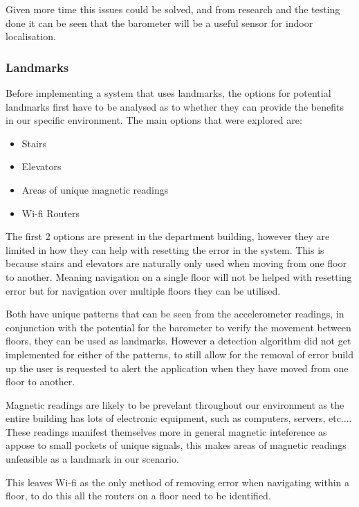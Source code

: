 \documentclass[12pt,a4paper]{report}
\begin{document}
Given more time this issues could be solved, and from research and the testing done it can be seen that the barometer will be a useful sensor for indoor localisation.

\subsubsection{Landmarks}

Before implementing a system that uses landmarks, the options for potential landmarks first have to be analysed as to whether they can provide the benefits in our specific environment. The main options that were explored are:

\begin{itemize}
	\item Stairs
	\item Elevators
	\item Areas of unique magnetic readings
	\item Wi-fi Routers
\end{itemize}

The first 2 options are present in the department building, however they are limited in how they can help with resetting the error in the system. This is because stairs and elevators are naturally only used when moving from one floor to another. Meaning navigation on a single floor will not be helped with resetting error but for navigation over multiple floors they can be utilised. 

Both have unique patterns that can be seen from the accelerometer readings, in conjunction with the potential for the barometer to verify the movement between floors, they can be used as landmarks. However a detection algorithm did not get implemented for either of the patterns, to still allow for the removal of error build up the user is requested to alert the application when they have moved from one floor to another.

Magnetic readings are likely to be prevelant throughout our environment as the entire building has lots of electronic equipment, such as computers, servers, etc.... These readings manifest themselves more in general magnetic inteference as appose to small pockets of unique signals, this makes areas of magnetic readings unfeasible as a landmark in our scenario.

This leaves Wi-fi as the only method of removing error when navigating within a floor, to do this all the routers on a floor need to be identified.
\end{document}
